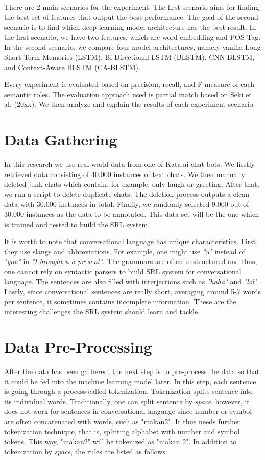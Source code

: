 There are 2 main scenarios for the experiment. The first scenario aims for finding the best set of features that output the best performance. The goal of the second scenario is to find which deep learning model architecture has the best result. In the first scenario, we have two features, which are word embedding and POS Tag. In the second scenario, we compare four model architectures, namely vanilla Long Short-Term Memories (LSTM), Bi-Directional LSTM (BLSTM), CNN-BLSTM, and Context-Aware BLSTM (CA-BLSTM).

Every experiment is evaluated based on precision, recall, and F-measure of each semantic roles. The evaluation approach used is partial match based on Seki et al. (20xx). We then analyze and explain the results of each experiment scenario.

\section{Data Gathering}
In this research we use real-world data from one of Kata.ai chat bots. We firstly retrieved data consisting of 40.000 instances of text chats. We then manually deleted junk chats which contain, for example, only laugh or greeting. After that, we run a script to delete duplicate chats. The deletion process outputs a clean data with 30.000 instances in total. Finally, we randomly selected 9.000 out of 30.000 instances as the data to be annotated. This data set will be the one which is trained and tested to build the SRL system.

It is worth to note that conversational language has unique characteristics. First, they use slangs and abbreviations. For example, one might use \textit{"u"} instead of \textit{"you"} in \textit{"I brought u a present"}. The grammars are often unstructured and thus, one cannot rely on syntactic parsers to build SRL system for conversational language. The sentences are also filled with interjections such as \textit{"haha"} and \textit{"lol"}. Lastly, since conversational sentences are really short, averaging around 5-7 words per sentence, it sometimes contains incomplete information. These are the interesting challenges the SRL system should learn and tackle.

\section{Data Pre-Processing}
After the data has been gathered, the next step is to pre-process the data so that it could be fed into the machine learning model later. In this step, each sentence is going through a process called tokenization. Tokenization splits sentence into its individual words. Traditionally, one can split sentence by \textit{space}, however, it does not work for sentences in conversational language since number or symbol are often concatenated with words, such as "makan2". It thus needs further tokenization technique, that is, splitting alphabet with number and symbol tokens. This way, "makan2" will be tokenized as "makan 2". In addition to tokenization by \textit{space}, the rules are listed as follows:

